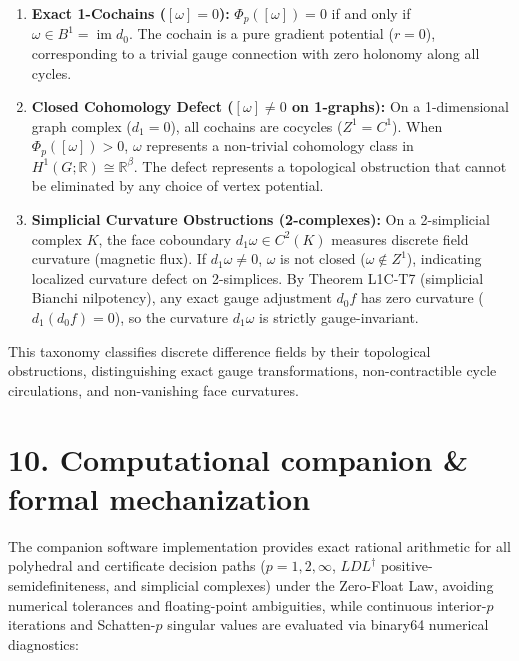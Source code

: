 \documentclass[
]{article}
\providecommand{\tightlist}{%
  \setlength{\itemsep}{0pt}\setlength{\parskip}{0pt}}
\providecommand{\tightlist}{%
  \setlength{\itemsep}{0pt}\setlength{\parskip}{0pt}}
\begin{document}
\begin{enumerate}
\def\labelenumi{\arabic{enumi}.}
\tightlist
\item
  \textbf{Exact 1-Cochains (\([\omega] = 0\)):}
  \(\Phi_p([\omega]) = 0\) if and only if \(\omega \in B^1 = \operatorname{im} d_0\). The cochain is a pure gradient potential (\(r = 0\)), corresponding to a trivial gauge connection with zero holonomy along all cycles.
\item
  \textbf{Closed Cohomology Defect (\([\omega] \ne 0\) on 1-graphs):}
  On a 1-dimensional graph complex (\(d_1 = 0\)), all cochains are cocycles (\(Z^1 = C^1\)). When \(\Phi_p([\omega]) > 0\), \(\omega\) represents a non-trivial cohomology class in \(H^1(G; \mathbb{R}) \cong \mathbb{R}^\beta\). The defect represents a topological obstruction that cannot be eliminated by any choice of vertex potential.
\item
  \textbf{Simplicial Curvature Obstructions (2-complexes):}
  On a 2-simplicial complex \(K\), the face coboundary \(d_1 \omega \in C^2(K)\) measures discrete field curvature (magnetic flux). If \(d_1 \omega \ne 0\), \(\omega\) is not closed (\(\omega \notin Z^1\)), indicating localized curvature defect on 2-simplices. By Theorem L1C-T7 (simplicial Bianchi nilpotency), any exact gauge adjustment \(d_0 f\) has zero curvature (\(d_1(d_0 f) = 0\)), so the curvature \(d_1 \omega\) is strictly gauge-invariant.
\end{enumerate}

This taxonomy classifies discrete difference fields by their topological obstructions, distinguishing exact gauge transformations, non-contractible cycle circulations, and non-vanishing face curvatures.

\section{10. Computational companion \& formal mechanization}\label{computational-companion-formal-mechanization}

The companion software implementation provides exact rational arithmetic for all
polyhedral and certificate decision paths (\(p=1, 2, \infty\), \(LDL^\dagger\) positive-semidefiniteness,
and simplicial complexes) under the Zero-Float Law, avoiding numerical tolerances and
floating-point ambiguities, while continuous interior-\(p\) iterations and Schatten-\(p\)
singular values are evaluated via binary64 numerical diagnostics:
\end{document}
